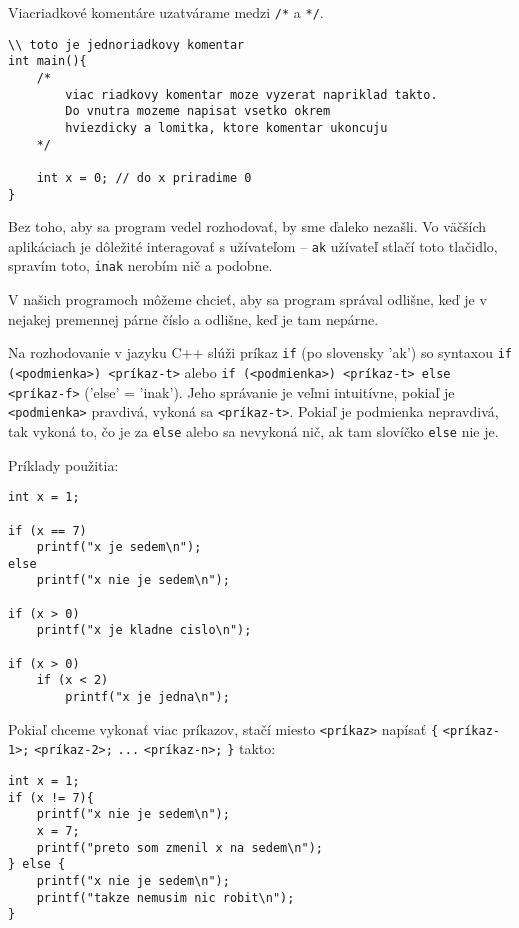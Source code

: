 Viacriadkové komentáre uzatvárame medzi \verb!/*! a \verb!*/!.

\begin{lstlisting}
\\ toto je jednoriadkovy komentar
int main(){
    /*
        viac riadkovy komentar moze vyzerat napriklad takto.
        Do vnutra mozeme napisat vsetko okrem
        hviezdicky a lomitka, ktore komentar ukoncuju
    */
    
    int x = 0; // do x priradime 0
}
\end{lstlisting}


Bez toho, aby sa program vedel rozhodovať, by sme ďaleko nezašli. Vo väčších
aplikáciach je dôležité interagovať s užívateľom -- \verb!ak! užívateľ stlačí
toto tlačidlo, spravím toto, \verb!inak!  nerobím nič a podobne. 

V našich programoch môžeme chcieť, aby sa program správal odlišne, keď je v
nejakej premennej párne číslo a odlišne, keď je tam nepárne.

Na rozhodovanie v jazyku C++ slúži príkaz \verb!if! (po slovensky 'ak') so
syntaxou \verb!if (<podmienka>) <príkaz-t>! alebo \verb!if (<podmienka>) <príkaz-t> else <príkaz-f>!
('else' = 'inak'). Jeho správanie je veľmi intuitívne, pokiaľ je
\verb!<podmienka>! pravdivá, vykoná sa \verb!<príkaz-t>!.  Pokiaľ je podmienka
nepravdivá, tak vykoná to, čo je za \verb!else! alebo sa nevykoná nič, ak tam
slovíčko \verb!else! nie je.

Príklady použitia:
\begin{lstlisting}
int x = 1;

if (x == 7) 
    printf("x je sedem\n");
else
    printf("x nie je sedem\n");

if (x > 0)
    printf("x je kladne cislo\n");

if (x > 0)
    if (x < 2)
        printf("x je jedna\n");
\end{lstlisting}

Pokiaľ chceme vykonať viac príkazov, stačí miesto \verb!<príkaz>! napísať
\verb!{! \verb!<príkaz-1>;! \verb!<príkaz-2>;! \verb!...!  \verb!<príkaz-n>;!
\verb!}! takto:
\begin{lstlisting}
int x = 1;
if (x != 7){
    printf("x nie je sedem\n");
    x = 7;
    printf("preto som zmenil x na sedem\n");
} else {
    printf("x nie je sedem\n");
    printf("takze nemusim nic robit\n");
}
\end{lstlisting}


